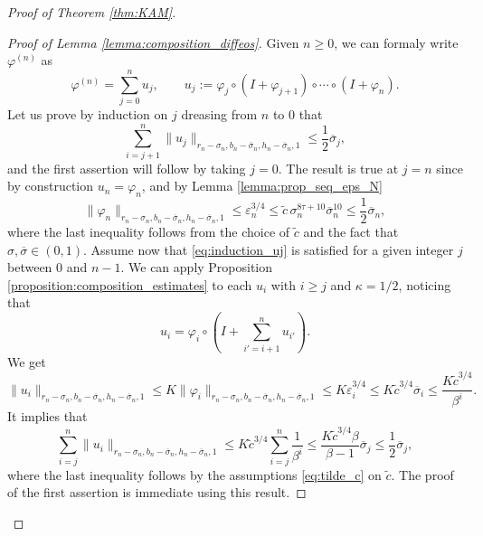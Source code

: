 \documentclass[10pt,a4paper]{amsart}
\begin{document}
\begin{proof}[Proof of Theorem \ref{thm:KAM}]
\begin{proof}[Proof of Lemma \ref{lemma:composition_diffeos}]
    Given $n\geq 0$, we can formaly write $\varphi^{(n)}$ as
    \[
    \varphi^{(n)} = \sum_{j=0}^n u_j,
    \qquad
    u_j := \varphi_j\circ(I+\varphi_{j+1})\circ\cdots\circ (I+\varphi_n).
    \]
    Let us prove by induction on $j$ dreasing from $n$ to $0$ that
    \begin{equation}
    \label{eq:induction_uj}
    \sum_{i=j+1}^n \|u_j\|_{r_n-\sigma_n, b_n-\overline\sigma_n, h_n-\overline\sigma_n,1}\leq \frac{1}{2}\overline\sigma_j,
    \end{equation}
    and the first assertion will follow by taking $j=0$. The result is true at $j=n$ since by construction $u_n=\varphi_n$, and by Lemma \ref{lemma:prop_seq_eps_N}
    \[
    \|\varphi_n\|_{r_n-\sigma_n, b_n-\overline\sigma_n, h_n-\overline\sigma_n,1}
    \leq \varepsilon_n^{3/4} 
    \leq \tilde c
    \,\sigma_n^{8\tau+10}\overline\sigma_n^{10}
    \leq \frac{1}{2}\overline\sigma_n,
    \]
    where the last inequality follows from the choice of $\tilde c$ and the fact that $\sigma,\overline\sigma\in(0,1)$.
    Assume now that \eqref{eq:induction_uj} is satisfied for a given integer $j$ between $0$ and $n-1$. 
    We can apply Proposition \ref{proposition:composition_estimates} to each $u_i$ with $i\geq j$ and $\kappa=1/2$, noticing that
    \[
    u_i = \varphi_i\circ\left(I+\sum_{i'=i+1}^nu_{i'}\right).
    \]
    We get
    \[
    \|u_i\|_{r_n-\sigma_n, b_n-\overline\sigma_n, h_n-\overline\sigma_n,1}
    \leq K\|\varphi_i\|_{r_n-\sigma_n, b_n-\overline\sigma_n, h_n-\overline\sigma_n,1}
    \leq 
    K\varepsilon_i^{3/4}
    \leq K\tilde c^{3/4}\overline\sigma_i \leq \frac{K\tilde c^{3/4}}{\beta^i}.
    \]
    It implies that
    \[
    \sum_{i=j}^n \|u_i\|_{r_n-\sigma_n, b_n-\overline\sigma_n, h_n-\overline\sigma_n,1}
    \leq 
    K\tilde c^{3/4}\sum_{i=j}^n\frac{1}{\beta^i}
    \leq 
    \frac{K\tilde c^{3/4}\beta}{\beta-1}\overline\sigma_j\leq \frac{1}{2} \overline\sigma_j,
    \]
    where the last inequality follows by the assumptions \eqref{eq:tilde_c} on $\tilde c$. The proof of the first assertion is immediate using this result.


\end{proof}
\end{proof}
\end{document}
